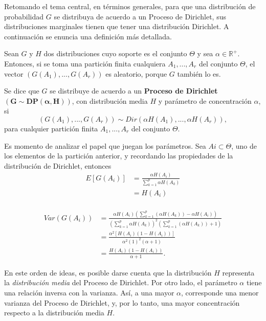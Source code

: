 Retomando el tema central, en t\'erminos generales, para que una distribuci\'on de probabilidad $G$ se distribuya de acuerdo a un Proceso de Dirichlet, sus distribuciones marginales tienen que tener una distribuci\'on Dirichlet. A continuaci\'on se enuncia una definici\'on m\'as detallada.

\begin{defin}
    Sean $G$ y $H$ dos distribuciones cuyo soporte es el conjunto $\Theta$ y sea $\alpha \in \mathbb{R}^+$. Entonces, si se toma una partici\'on finita cualquiera $A_1,...,A_r$ del conjunto $\Theta$, el vector $(G(A_1),...,G(A_r))$ es aleatorio, porque $G$ tambi\'en lo es.
    
    Se dice que $G$ se distribuye de acuerdo a un \textbf{Proceso de Dirichlet} $\bm{(G \sim DP(\alpha,H))}$, con distribuci\'on media $H$ y par\'ametro de concentraci\'on $\alpha$, si
    \begin{equation*}
        (G(A_1),...,G(A_r)) \sim Dir(\alpha H(A_1),...,\alpha H(A_r)), 
    \end{equation*}
    para cualquier partici\'on finita $A_1,...,A_r$ del conjunto $\Theta$.
\end{defin}

Es momento de analizar el papel que juegan los par\'ametros. Sea $Ai \subset \Theta$, uno de los elementos de la partici\'on anterior, y recordando las propiedades de la distribuci\'on de Dirichlet, entonces
\begin{equation*}
\begin{aligned}
    E[G(A_i)] 
    &= \frac{\alpha H(A_i)}{\sum_{k=1}^p \alpha H(A_k)} \\
    &= H(A_i) \\
\end{aligned}
\end{equation*}

\begin{equation*}
\begin{aligned}
    Var(G(A_i)) 
    &= \frac{\alpha H(A_i)\left(\sum_{k=1}^p(\alpha H(A_k)) - \alpha H(A_i)\right)}
       {\left(\sum_{k=1}^p \alpha H(A_k)\right)^2\left(\sum_{k=1}^p(\alpha H(A_k)) + 1\right)} \\
    &= \frac{\alpha^2 [H(A_i)(1 - H(A_i))]}
       {\alpha^2 (1)^2(\alpha + 1)} \\
    &= \frac{H(A_i)(1 - H(A_i))}
       {\alpha + 1}.
\end{aligned}
\end{equation*}

En este orden de ideas, es posible darse cuenta que la distribuci\'on $H$ representa la \textit{distribuci\'on media} del Proceso de Dirichlet. Por otro lado, el par\'ametro $\alpha$ tiene una relaci\'on inversa con la varianza. As\'i, a una mayor $\alpha$, corresponde una menor varianza del Proceso de Dirichlet, y, por lo tanto, una mayor concentraci\'on respecto a la distribuci\'on media $H$. 

